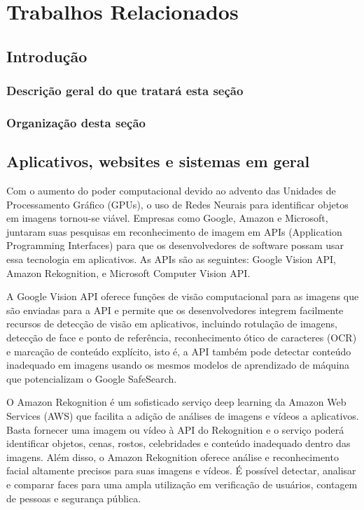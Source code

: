 \section{Trabalhos Relacionados \label{sec:trab_rel}}

\subsection*{Introdução}

\subsubsection*{Descrição geral do que tratará esta seção}
\subsubsection*{Organização desta seção}

\subsection{Aplicativos, websites e sistemas em geral \label{subsec:app_web}}

Com o aumento do poder computacional devido ao advento das Unidades de Processamento Gráfico (GPUs), o uso de Redes Neurais para identificar objetos em imagens tornou-se viável. 
Empresas como Google, Amazon e Microsoft, juntaram suas pesquisas em reconhecimento de imagem em APIs (Application Programming Interfaces) para que os desenvolvedores de software possam usar essa tecnologia em aplicativos. As APIs são as seguintes: Google Vision API, Amazon Rekognition, e Microsoft Computer Vision API.

A Google Vision API \cite{google_vision} oferece funções de visão computacional para as imagens que são enviadas para a API e permite que os desenvolvedores integrem facilmente recursos de detecção de visão em aplicativos, incluindo rotulação de imagens, detecção de face e ponto de referência, reconhecimento ótico de caracteres (OCR) e marcação de conteúdo explícito, isto é, a API também pode detectar conteúdo inadequado em imagens usando os mesmos modelos de aprendizado de máquina que potencializam o Google SafeSearch. 

O Amazon Rekognition \cite{amazon_rekognition} é um sofisticado serviço deep learning da Amazon Web Services (AWS) que facilita a adição de análises de imagens e vídeos a aplicativos. Basta fornecer uma imagem ou vídeo à API do Rekognition e o serviço poderá identificar objetos, cenas, rostos, celebridades e conteúdo inadequado dentro das imagens. Além disso, o Amazon Rekognition oferece análise e reconhecimento facial altamente precisos para suas imagens e vídeos. É possível detectar, analisar e comparar faces para uma ampla utilização em verificação de usuários, contagem de pessoas e segurança pública.


